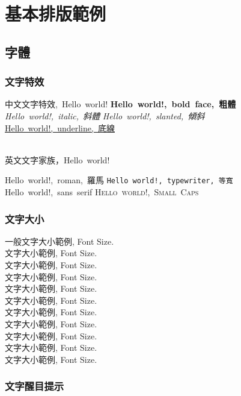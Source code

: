 \chapter{基本排版範例}\label{example}

\section{字體}
\subsection{文字特效}

\hbox{中文文字特效, Hello world!}
{\LARGE
\hbox{\textbf{Hello world!, bold face, 粗體}}
\hbox{\textit{Hello world!, italic, 斜體}}
\hbox{\textsl{Hello world!, slanted, 傾斜}}
\hbox{\underline{Hello world!, underline, 底線}}
}

~\\

\hbox{英文文字家族，Hello world!}

{\LARGE
   \hbox{\textrm{Hello world!, roman, 羅馬}}
   \hbox{\texttt{Hello world!, typewriter, 等寬}}
   \hbox{\textsf{Hello world!, sans serif}}
   \hbox{\textsc{Hello world!, Small Caps}}
}

\clearpage

\subsection{文字大小}
一般文字大小範例, Font Size. \\
{\tiny 文字大小範例, Font Size.} \\
{\scriptsize 文字大小範例, Font Size.} \\
{\footnotesize 文字大小範例, Font Size.} \\
{\small 文字大小範例, Font Size.} \\
{\normalsize 文字大小範例, Font Size.} \\
{\large 文字大小範例, Font Size.} \\
{\Large 文字大小範例, Font Size.} \\
{\LARGE 文字大小範例, Font Size.} \\
{\huge 文字大小範例, Font Size.} \\
{\Huge 文字大小範例, Font Size.}
\clearpage

\subsection{文字醒目提示}


